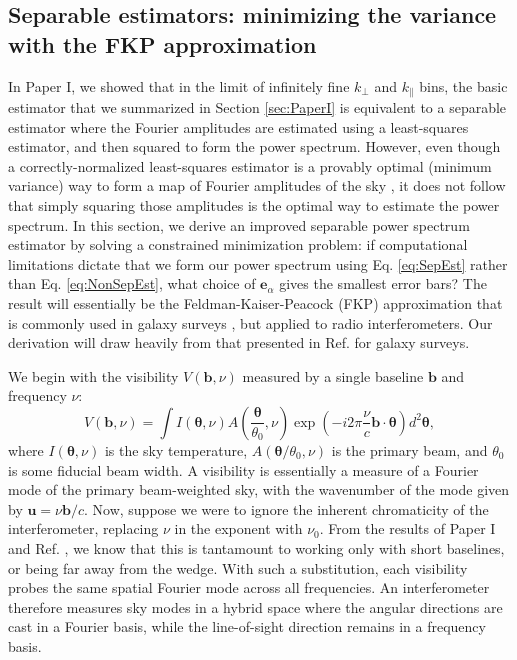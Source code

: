 \documentclass[twocolumn,aps,prd,nofootinbib,showpacs]{revtex4-1}
\begin{document}
\subsection{Separable estimators: minimizing the variance with the FKP approximation}
\label{sec:FKP}
In Paper I, we showed that in the limit of infinitely fine $k_\perp$ and $k_\parallel$ bins, the basic estimator that we summarized in Section \ref{sec:PaperI} is equivalent to a separable estimator where the Fourier amplitudes are estimated using a least-squares estimator, and then squared to form the power spectrum.  However, even though a correctly-normalized least-squares estimator is a provably optimal (minimum variance) way to form a map of Fourier amplitudes of the sky \cite{Tegmark1997a}, it does not follow that simply squaring those amplitudes is the optimal way to estimate the power spectrum.  In this section, we derive an improved separable power spectrum estimator by solving a constrained minimization problem: if computational limitations dictate that we form our power spectrum using Eq. \eqref{eq:SepEst} rather than Eq. \eqref{eq:NonSepEst}, what choice of $\mathbf{e}_\alpha$ gives the smallest error bars? The result will essentially be the Feldman-Kaiser-Peacock (FKP) approximation that is commonly used in galaxy surveys \cite{Feldman1994, Tegmark1998}, but applied to radio interferometers.  Our derivation will draw heavily from that presented in Ref. \cite{Tegmark1998} for galaxy surveys.

We begin with the visibility $V(\mathbf{b},\nu)$ measured by a single baseline $\mathbf{b}$ and frequency $\nu$:
\begin{equation}
\label{eq:MeasurementEqn}
V(\mathbf{b},\nu) = \int I(\boldsymbol \theta, \nu) A \left(\frac{\boldsymbol \theta}{\theta_0}, \nu \right) \exp\left(-i 2 \pi \frac{\nu}{c} \mathbf{b} \cdot \boldsymbol \theta \right) d^2 \boldsymbol \theta,
\end{equation}
where $I(\boldsymbol \theta, \nu)$ is the sky temperature, $A (\boldsymbol \theta / \theta_0, \nu)$ is the primary beam, and $\theta_0$ is some fiducial beam width.  A visibility is essentially a measure of a Fourier mode of the primary beam-weighted sky, with the wavenumber of the mode given by $\mathbf{u} = \nu \mathbf{b}/c$.  Now, suppose we were to ignore the inherent chromaticity of the interferometer, replacing $\nu$ in the exponent with $\nu_0$.  From the results of Paper I and Ref. \cite{Parsons2012b}, we know that this is tantamount to working only with short baselines, or being far away from the wedge.  With such a substitution, each visibility probes the same spatial Fourier mode across all frequencies.  An interferometer therefore measures sky modes in a hybrid space where the angular directions are cast in a Fourier basis, while the line-of-sight direction remains in a frequency basis.
\end{document}
